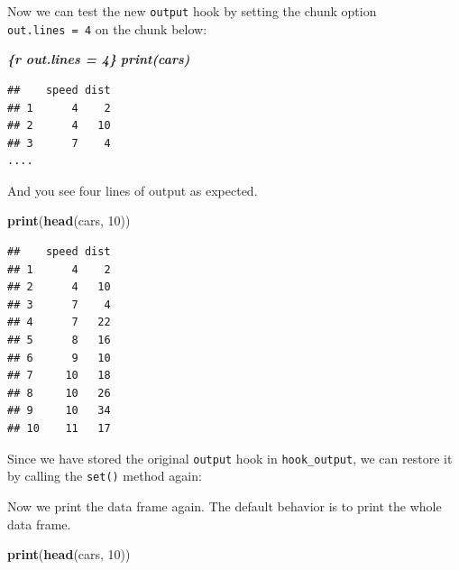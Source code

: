 \documentclass[
  a4paper,
  twoside,
  openright]{book}
\newenvironment{Shaded}{\begin{snugshade}}{\end{snugshade}}
\newcommand{\AttributeTok}[1]{\textcolor[rgb]{0.13,0.29,0.53}{#1}}
\newcommand{\DecValTok}[1]{\textcolor[rgb]{0.00,0.00,0.81}{#1}}
\newcommand{\FunctionTok}[1]{\textcolor[rgb]{0.13,0.29,0.53}{\textbf{#1}}}
\newcommand{\InformationTok}[1]{\textcolor[rgb]{0.56,0.35,0.01}{\textbf{\textit{#1}}}}
\newcommand{\NormalTok}[1]{#1}
\newcommand{\SpecialCharTok}[1]{\textcolor[rgb]{0.81,0.36,0.00}{\textbf{#1}}}
\theoremstyle{definition}
\theoremstyle{definition}
\theoremstyle{definition}
\theoremstyle{definition}
\theoremstyle{remark}
\begin{document}
Now we can test the new \texttt{output} hook by setting the chunk option \texttt{out.lines\ =\ 4} on the chunk below:

\begin{Shaded}
\begin{Highlighting}[]
\InformationTok{\textasciigrave{}\textasciigrave{}\textasciigrave{}\{r out.lines = 4\}}
\InformationTok{print(cars)}
\InformationTok{\textasciigrave{}\textasciigrave{}\textasciigrave{}}
\end{Highlighting}
\end{Shaded}

\begin{verbatim}
##    speed dist
## 1      4    2
## 2      4   10
## 3      7    4
....
\end{verbatim}

And you see four lines of output as expected.

\begin{Shaded}
\begin{Highlighting}[]
\FunctionTok{print}\NormalTok{(}\FunctionTok{head}\NormalTok{(cars, }\DecValTok{10}\NormalTok{))}
\end{Highlighting}
\end{Shaded}

\begin{verbatim}
##    speed dist
## 1      4    2
## 2      4   10
## 3      7    4
## 4      7   22
## 5      8   16
## 6      9   10
## 7     10   18
## 8     10   26
## 9     10   34
## 10    11   17
\end{verbatim}

Since we have stored the original \texttt{output} hook in \texttt{hook\_output}, we can restore it by calling the \texttt{set()} method again:

\begin{Shaded}
\end{Shaded}

Now we print the data frame again. The default behavior is to print the whole data frame.

\begin{Shaded}
\begin{Highlighting}[]
\FunctionTok{print}\NormalTok{(}\FunctionTok{head}\NormalTok{(cars, }\DecValTok{10}\NormalTok{))}
\end{Highlighting}
\end{Shaded}
\end{document}
